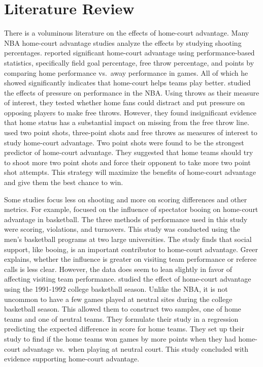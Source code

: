 \documentclass[12pt, letterpaper, titlepage]{article}
\begin{document}
\hypertarget{sec:litrev}{%
\section{Literature Review}\label{sec:litrev}}

There is a voluminous literature on the effects of home-court advantage.
Many NBA home-court advantage studies analyze the effects by studying shooting
percentages. \citet{Kotecki} reported significant home-court advantage using performance-based
statistics, specifically field goal percentage, free throw percentage, and
points by comparing home performance vs.~away performance in games.
All of which he showed significantly indicates that
home-court helps teams play better. \citet{Cao} studied the effects
of pressure on performance in the NBA. Using throws as their measure of
interest, they tested whether home
fans could distract and put pressure on opposing players to make free
throws. However, they found insignificant
evidence that home status has a substantial impact on missing from the free throw
line. \citet{Harris} used two point shots, three-point shots and free throws as measures
of interest to study home-court advantage. Two point shots were found to be
the strongest predictor of home-court advantage. They suggested
that home teams should try to shoot more two point shots and force
their opponent to take more two point shot attempts. This strategy will maximize
the benefits of home-court advantage and give them the best chance to win.

Some studies focus less on shooting and more on scoring differences and other metrics.
For example, \citet{Greer} focused on the influence of spectator booing on
home-court advantage in basketball. The three methods of performance used
in this study were scoring, violations, and turnovers. This study was conducted
using the men's basketball programs at two large universities. The study finds that
social support, like booing, is an important contributor to home-court advantage.
Greer explains, whether the influence is greater on visiting team performance or
referee calls is less clear. However, the data does seem to lean slightly in
favor of affecting visiting team performance. \citet{Harville} studied the
effect of home-court advantage using the 1991-1992 college basketball season.
Unlike the NBA, it is not uncommon to have a few games played at neutral sites
during the college basketball season. This allowed them to construct two samples,
one of home teams and one of neutral teams. They formulate their study in a
regression predicting the expected difference in score for home teams.
They set up their study to find if the home teams won games by more points when
they had home-court advantage vs.~when playing at neutral court. This study
concluded with evidence supporting home-court advantage.
\end{document}
